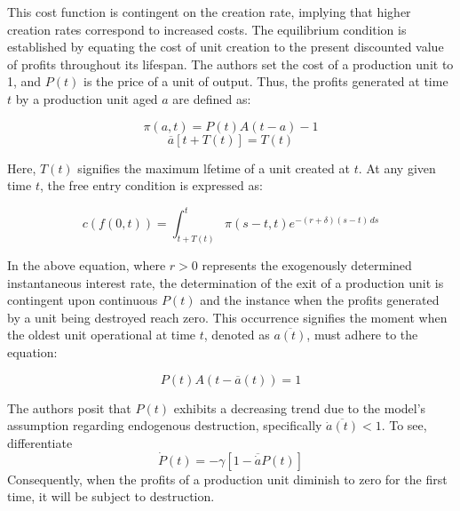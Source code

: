 \documentclass[12pt]{article}
\begin{document}
This cost function is contingent on the creation rate, implying that higher creation rates correspond to increased
costs. The equilibrium condition is established by equating the cost of unit creation to the present discounted value of
profits throughout its lifespan. The authors set the cost of a production unit to 1, and \(P(t)\) is the price of a unit
of output. Thus, the profits generated at time \(t\) by a production unit aged \(a\) are defined as: 

\[\pi(a,t)= P(t)A(t-a)-1\]
\[\overline{a}[t+T(t)] = T(t)\]

Here, \(T(t)\) signifies the maximum lfetime of a unit created at \(t\). At any given time \(t\), the free entry
condition is expressed as: 

\[ c(f(0,t)) = \int_{t+T(t)}^{t}\pi(s-t,t)e^{-(r+\delta)(s-t)\,ds} \]

In the above equation, where \(r>0\) represents the exogenously determined instantaneous interest rate, the determination of
the exit of a production unit is contingent upon continuous \(P(t)\) and the instance when the profits generated by a
unit being destroyed reach zero. This occurrence signifies the moment when the oldest unit operational at time \(t\),
denoted as \(\overline{a(t)}\), must adhere to the equation: 

\[P(t)A(t-\overline{a}(t))=1\]

The authors posit that \(P(t)\) exhibits a decreasing trend due to the model's assumption regarding endogenous
destruction, specifically \(\overline{\dot{a}(t)}<1\). To see, differentiate 
\[\dot{P}(t)=-\gamma\left[1-\overline{\dot{a}}P(t)\right]\]
Consequently, when the profits of a production unit diminish to
zero for the first time, it will be subject to destruction. 
\end{document}

